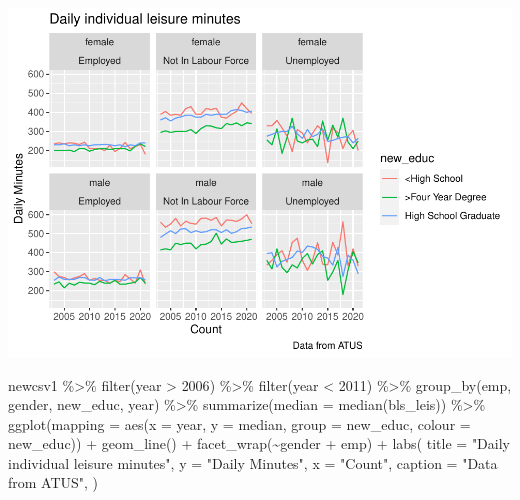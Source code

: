 \documentclass[
]{article}
\newenvironment{Shaded}{\begin{snugshade}}{\end{snugshade}}
\newcommand{\AttributeTok}[1]{\textcolor[rgb]{0.77,0.63,0.00}{#1}}
\newcommand{\DecValTok}[1]{\textcolor[rgb]{0.00,0.00,0.81}{#1}}
\newcommand{\FunctionTok}[1]{\textcolor[rgb]{0.00,0.00,0.00}{#1}}
\newcommand{\NormalTok}[1]{#1}
\newcommand{\SpecialCharTok}[1]{\textcolor[rgb]{0.00,0.00,0.00}{#1}}
\newcommand{\StringTok}[1]{\textcolor[rgb]{0.31,0.60,0.02}{#1}}
\begin{document}
\includegraphics{Paper2_files/figure-latex/employment-3.pdf}

\begin{Shaded}
\begin{Highlighting}[]
\NormalTok{newcsv1 }\SpecialCharTok{\%\textgreater{}\%}
  \FunctionTok{filter}\NormalTok{(year }\SpecialCharTok{\textgreater{}} \DecValTok{2006}\NormalTok{) }\SpecialCharTok{\%\textgreater{}\%}
  \FunctionTok{filter}\NormalTok{(year }\SpecialCharTok{\textless{}} \DecValTok{2011}\NormalTok{) }\SpecialCharTok{\%\textgreater{}\%}
  \FunctionTok{group\_by}\NormalTok{(emp, gender, new\_educ, year) }\SpecialCharTok{\%\textgreater{}\%}
  \FunctionTok{summarize}\NormalTok{(}\AttributeTok{median =} \FunctionTok{median}\NormalTok{(bls\_leis)) }\SpecialCharTok{\%\textgreater{}\%}
  \FunctionTok{ggplot}\NormalTok{(}\AttributeTok{mapping =} \FunctionTok{aes}\NormalTok{(}\AttributeTok{x =}\NormalTok{ year, }\AttributeTok{y =}\NormalTok{ median, }\AttributeTok{group =}\NormalTok{ new\_educ, }\AttributeTok{colour =}\NormalTok{ new\_educ)) }\SpecialCharTok{+}
  \FunctionTok{geom\_line}\NormalTok{() }\SpecialCharTok{+}
  \FunctionTok{facet\_wrap}\NormalTok{(}\SpecialCharTok{\textasciitilde{}}\NormalTok{gender }\SpecialCharTok{+}\NormalTok{ emp) }\SpecialCharTok{+}
  \FunctionTok{labs}\NormalTok{(}
  \AttributeTok{title =} \StringTok{"Daily individual leisure minutes"}\NormalTok{,}
  \AttributeTok{y =} \StringTok{"Daily Minutes"}\NormalTok{,}
  \AttributeTok{x =} \StringTok{"Count"}\NormalTok{,}
  \AttributeTok{caption =} \StringTok{"Data from ATUS"}\NormalTok{,}
\NormalTok{)}
\end{Highlighting}
\end{Shaded}
\end{document}
